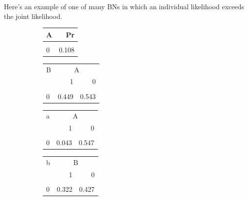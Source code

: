\documentclass[
  10pt,
  dvipsnames,enabledeprecatedfontcommands]{scrartcl}
\begin{document}
Here's an example of one of many \textsf{BNs} in which an individual
likelihood exceeds the joint likelihood.

\begin{figure}
\begin{subfigure}[!ht]{0.45\textwidth}

\footnotesize 
\begin{tabular}{lr}
\toprule
A & Pr\\
\midrule
\cellcolor{gray!6}{1} & \cellcolor{gray!6}{0.892}\\
0 & 0.108\\
\bottomrule
\end{tabular}

\vspace{2mm}

\begin{tabular}{lrr}
\toprule
\multicolumn{1}{c}{B} & \multicolumn{2}{c}{A} \\
  & 1 & 0\\
\midrule
\cellcolor{gray!6}{1} & \cellcolor{gray!6}{0.551} & \cellcolor{gray!6}{0.457}\\
0 & 0.449 & 0.543\\
\bottomrule
\end{tabular}

\vspace{2mm}

\begin{tabular}{lrr}
\toprule
\multicolumn{1}{c}{a} & \multicolumn{2}{c}{A} \\
  & 1 & 0\\
\midrule
\cellcolor{gray!6}{1} & \cellcolor{gray!6}{0.957} & \cellcolor{gray!6}{0.453}\\
0 & 0.043 & 0.547\\
\bottomrule
\end{tabular}


\vspace{2mm}

\begin{tabular}{lrr}
\toprule
\multicolumn{1}{c}{b} & \multicolumn{2}{c}{B} \\
  & 1 & 0\\
\midrule
\cellcolor{gray!6}{1} & \cellcolor{gray!6}{0.678} & \cellcolor{gray!6}{0.573}\\
0 & 0.322 & 0.427\\
\bottomrule
\end{tabular}

\vspace{2mm}


\end{subfigure}
\end{figure}
\end{document}
